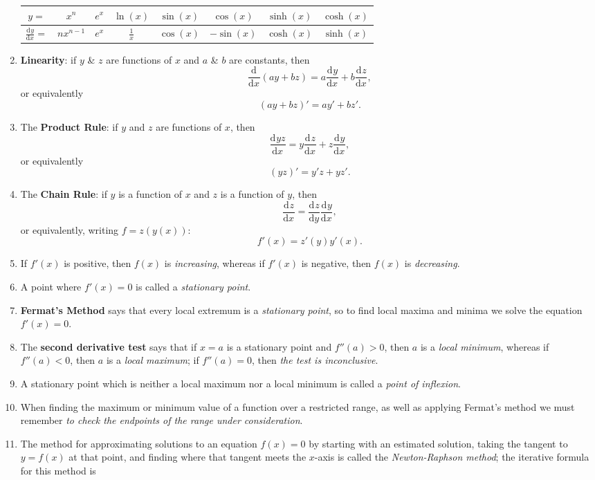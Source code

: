 \documentclass{article}
\newcommand{\deriv}[3][]{\frac{\mathrm{d}^{#1} #2}{\mathrm{d}#3^{#1}}}
\begin{document}
\begin{enumerate}
		\hfill\begin{tabular}{c|c|c|c|c|c|c|c}
			$y=$ & $x^n$ & $e^x$ & $\ln(x)$ & $\sin(x)$ & $\cos(x)$ & $\sinh(x)$ & $\cosh(x)$\\ \hline
			$\deriv{y}{x}=$ & $nx^{n-1}$ & $e^x$ & $\frac{1}{x}$ & $\cos(x)$ & $-\sin(x)$ & $\cosh(x)$ & $\sinh(x)$
		\end{tabular}\hfill
	\item \textbf{Linearity}: if $y$ \& $z$ are functions of $x$ and $a$ \& $b$ are constants, then
		\[\deriv{}{x}\left(ay+bz\right) = a\deriv{y}{x} + b\deriv{z}{x},\]
		or equivalently
		\[(ay+bz)'=ay'+bz'.\]
	\item The \textbf{Product Rule}: if $y$ and $z$ are functions of $x$, then
		\[\deriv{yz}{x} = y\deriv{z}{x}+z\deriv{y}{x},\]
		or equivalently
		\[(yz)'=y'z+yz'.\]
	\item The \textbf{Chain Rule}: if $y$ is a function of $x$ and $z$ is a function of $y$, then
		\[\deriv{z}{x}=\deriv{z}{y}\deriv{y}{x},\]
		or equivalently, writing $f=z(y(x))$:
		\[f'(x)=z'(y)y'(x).\]
	\item If $f'(x)$ is positive, then $f(x)$ is \textit{increasing}, whereas if $f'(x)$ is negative, then $f(x)$ is \textit{decreasing}.
	\item A point where $f'(x)=0$ is called a \textit{stationary point}.
	\item \textbf{Fermat's Method} says that every local extremum is a \textit{stationary point}, so to find local maxima and minima we solve the equation $f'(x)=0$.
	\item The \textbf{second derivative test} says that if $x=a$ is a stationary point and $f''(a)>0$, then $a$ is a \textit{local minimum}, whereas if $f''(a)<0$, then $a$ is a \textit{local maximum}; if $f''(a)=0$, then \textit{the test is inconclusive}.
	\item A stationary point which is neither a local maximum nor a local minimum is called a \textit{point of inflexion}.
	\item When finding the maximum or minimum value of a function over a restricted range, as well as applying Fermat's method we must remember \textit{to check the endpoints of the range under consideration}.
	\item The method for approximating solutions to an equation $f(x)=0$ by starting with an estimated solution, taking the tangent to $y=f(x)$ at that point, and finding where that tangent meets the $x$-axis is called the \textit{Newton-Raphson method}; the iterative formula for this method is

\end{enumerate}
\end{document}
